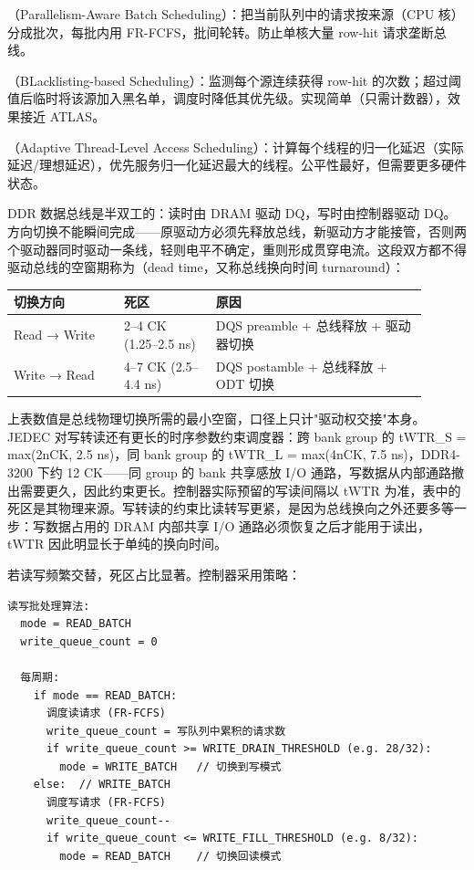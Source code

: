（Parallelism-Aware Batch Scheduling）：把当前队列中的请求按来源（CPU 核）分成批次，每批内用 FR-FCFS，批间轮转。防止单核大量 row-hit 请求垄断总线。

（BLacklisting-based Scheduling）：监测每个源连续获得 row-hit 的次数；超过阈值后临时将该源加入黑名单，调度时降低其优先级。实现简单（只需计数器），效果接近 ATLAS。

（Adaptive Thread-Level Access Scheduling）：计算每个线程的归一化延迟（实际延迟/理想延迟），优先服务归一化延迟最大的线程。公平性最好，但需要更多硬件状态。


DDR 数据总线是半双工的：读时由 DRAM 驱动 DQ，写时由控制器驱动 DQ。方向切换不能瞬间完成——原驱动方必须先释放总线，新驱动方才能接管，否则两个驱动器同时驱动一条线，轻则电平不确定，重则形成贯穿电流。这段双方都不得驱动总线的空窗期称为（dead time，又称总线换向时间 turnaround）：

\begin{longtable}{L{0.24\linewidth}L{0.2\linewidth}L{0.46\linewidth}}
\toprule
切换方向 & 死区 & 原因 \\
\midrule
Read → Write & 2--4 CK (1.25--2.5 ns) & DQS preamble + 总线释放 + 驱动器切换 \\
Write → Read & 4--7 CK (2.5--4.4 ns) & DQS postamble + 总线释放 + ODT 切换 \\
\bottomrule
\end{longtable}

上表数值是总线物理切换所需的最小空窗，口径上只计"驱动权交接"本身。JEDEC 对写转读还有更长的时序参数约束调度器：跨 bank group 的 tWTR\_S = max(2nCK, 2.5 ns)，同 bank group 的 tWTR\_L = max(4nCK, 7.5 ns)，DDR4-3200 下约 12 CK——同 group 的 bank 共享感放 I/O 通路，写数据从内部通路撤出需要更久，因此约束更长。控制器实际预留的写读间隔以 tWTR 为准，表中的死区是其物理来源。写转读的约束比读转写更紧，是因为总线换向之外还要多等一步：写数据占用的 DRAM 内部共享 I/O 通路必须恢复之后才能用于读出，tWTR 因此明显长于单纯的换向时间。

若读写频繁交替，死区占比显著。控制器采用策略：

\begin{lstlisting}
读写批处理算法:
  mode = READ_BATCH
  write_queue_count = 0

  每周期:
    if mode == READ_BATCH:
      调度读请求 (FR-FCFS)
      write_queue_count = 写队列中累积的请求数
      if write_queue_count >= WRITE_DRAIN_THRESHOLD (e.g. 28/32):
        mode = WRITE_BATCH   // 切换到写模式
    else:  // WRITE_BATCH
      调度写请求 (FR-FCFS)
      write_queue_count--
      if write_queue_count <= WRITE_FILL_THRESHOLD (e.g. 8/32):
        mode = READ_BATCH    // 切换回读模式
\end{lstlisting}

